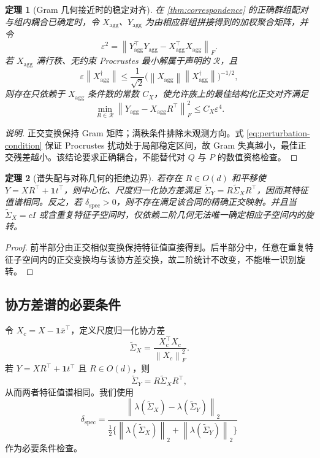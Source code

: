 \documentclass[10pt,a4paper,fontset=windows]{ctexart}
\newcommand{\norm}[1]{\left\lVert #1\right\rVert}
\newtheorem{theorem}{定理}
\theoremstyle{definition}
\theoremstyle{remark}
\begin{document}
\begin{theorem}[Gram 几何接近时的稳定对齐]
\label{thm:stability}
在 \cref{thm:correspondence} 的正确群组配对与组内耦合已确定时，令 $X_{\mathrm{agg}}$、$Y_{\mathrm{agg}}$ 为由相应群组拼接得到的加权聚合矩阵，并令
\begin{equation}
\varepsilon^2=\norm{Y_{\mathrm{agg}}^\top Y_{\mathrm{agg}}-X_{\mathrm{agg}}^\top X_{\mathrm{agg}}}_F.
\label{eq:gram-distortion}
\end{equation}
若 $X_{\mathrm{agg}}$ 满行秩、无约束 Procrustes 最小解属于声明的 $\mathcal R$，且
\begin{equation}
\varepsilon\norm{X_{\mathrm{agg}}^\dagger}
\le\frac{1}{\sqrt2}
\bigl(\norm{X_{\mathrm{agg}}}\norm{X_{\mathrm{agg}}^\dagger}\bigr)^{-1/2},
\label{eq:perturbation-condition}
\end{equation}
则存在只依赖于 $X_{\mathrm{agg}}$ 条件数的常数 $C_X$，使允许族上的最佳结构化正交对齐满足
\begin{equation}
\min_{R\in\mathcal R}\norm{Y_{\mathrm{agg}}-X_{\mathrm{agg}}R^\top}_F^2
\le C_X\varepsilon^4.
\label{eq:perturbation-bound}
\end{equation}
\end{theorem}
\begin{proof}[说明]
正交变换保持 Gram 矩阵；满秩条件排除未观测方向。式 \cref{eq:perturbation-condition} 保证 Procrustes 扰动处于局部稳定区间，故 Gram 失真越小，最佳正交残差越小。该结论要求正确耦合，不能替代对 $Q$ 与 $P$ 的数值资格检查。
\end{proof}

\begin{theorem}[谱失配与对称几何的拒绝边界]
\label{thm:refusal}
若存在 $R\in O(d)$ 和平移使 $Y=XR^\top+\bm1t^\top$，则中心化、尺度归一化协方差满足 $\widetilde\Sigma_Y=R\widetilde\Sigma_XR^\top$，因而其特征值谱相同。反之，若 $\delta_{\mathrm{spec}}>0$，则不存在满足该合同的精确正交映射。并且当 $\widetilde\Sigma_X=cI$ 或含重复特征子空间时，仅依赖二阶几何无法唯一确定相应子空间内的旋转。
\end{theorem}
\begin{proof}
前半部分由正交相似变换保持特征值直接得到。后半部分中，任意在重复特征子空间内的正交变换均与该协方差交换，故二阶统计不改变，不能唯一识别旋转。
\end{proof}

\subsection{协方差谱的必要条件}
令 $X_c=X-\bm1\bar x^\top$，定义尺度归一化协方差
\begin{equation}
\widetilde\Sigma_X=\frac{X_c^\top X_c}{\norm{X_c}_F^2}.
\end{equation}
若 $Y=XR^\top+\bm1t^\top$ 且 $R\in O(d)$，则
\begin{equation}
\widetilde\Sigma_Y=R\widetilde\Sigma_XR^\top,
\end{equation}
从而两者特征值谱相同。我们使用
\begin{equation}
\delta_{\mathrm{spec}}=
\frac{\norm{\lambda(\widetilde\Sigma_X)-\lambda(\widetilde\Sigma_Y)}_2}
{\frac12\{\norm{\lambda(\widetilde\Sigma_X)}_2+
\norm{\lambda(\widetilde\Sigma_Y)}_2\}}
\label{eq:spec-gap}
\end{equation}
作为必要条件检查。
\end{document}
